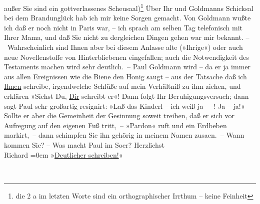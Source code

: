 \begin{ledgroupsized}[t]{13cm}
               außer Sie sind ein gottverlassenes {\pb}Scheusaal)\footnote{\noindent{}die 2 a im letzten Worte sind ein orthographischer Irrthum – keine Feinheit} Über Ihr und Goldmanns Schicksal  bei dem
               Brandunglück hab ich mir keine Sorgen gemacht. Von Goldmann wußte ich daß er noch nicht in Paris war, – ich sprach am selben {\pb}Tag telefonisch mit Ihrer Mama, und daß Sie nicht zu
               dergleichen Dingen gehen war mir bekannt.\pend
           \pstart
           – Wahrscheinlich sind Ihnen aber bei diesem Anlasse alte (»Ihrige«) oder auch neue
               Novellenstoffe von Hinterbliebenen eingefallen; auch {\pb}die Notwendigkeit des Testaments
               machen wird sehr deutlich. –\pend
           \pstart
           Paul Goldmann wird – da er ja immer aus allen
               Ereignissen wie die Biene den Honig saugt – aus der Tatsache daß ich \uline{Ihnen} schreibe, irgendwelche Schlüße auf mein Verhältniß zu
               ihm ziehen, und erklären {\pb}»Siehst
               Du, \uline{Dir} schreibt er«! Dann folgt Ihr
               Beruhigungsversuch; dann sagt Paul sehr
               großartig resignirt: »Laß das Kinderl – ich weiß ja– –! Ja – ja!« Sollte er aber die
               Gemeinheit der Gesinnung soweit treiben, daß er sich vor Aufregung {\pb}auf den eigenen Fuß tritt, –
               »Pardon« ruft und ein Erdbeben markirt, – dann schimpfen Sie ihn gehörig in meinem
               Namen zusa{\geminationm}en. –\pend
           \pstart
           Wann kommen Sie? –\pend
           \pstart
           Was macht Paul im So{\geminationm}er?\pend
           \pstart
           Herzlichst{\\[\baselineskip]}\spacefill\mbox{Richard}\pend
           \leftskip=0em{}\pstart
           »\uline{Deutlicher schreiben!}«\pend
           
         
         \endnumbering{}\end{ledgroupsized}  \newcommand{\dateiname}{L00675}\newcommand{\titel}{Richard Beer-Hofmann an Arthur Schnitzler, 12. 5. 1897}\newcommand{\editorInnen}{Martin Anton Müller und Gerd-Hermann Susen}
      
